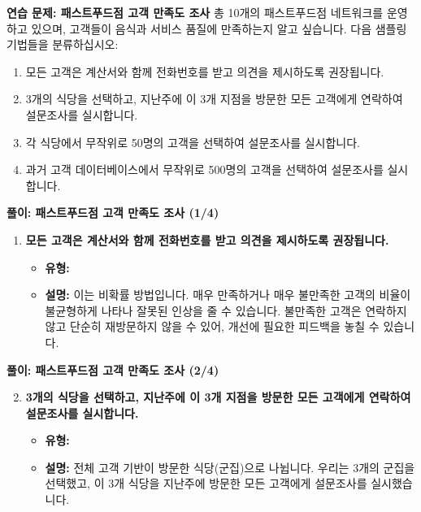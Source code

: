 \documentclass[11pt,a4paper]{article}
\begin{document}
\begin{practicebox}
\textbf{연습 문제: 패스트푸드점 고객 만족도 조사}
총 10개의 패스트푸드점 네트워크를 운영하고 있으며, 고객들이 음식과 서비스 품질에 만족하는지 알고 싶습니다. 다음 샘플링 기법들을 분류하십시오:
\begin{enumerate}
    \item 모든 고객은 계산서와 함께 전화번호를 받고 의견을 제시하도록 권장됩니다.
    \item 3개의 식당을 선택하고, 지난주에 이 3개 지점을 방문한 모든 고객에게 연락하여 설문조사를 실시합니다.
    \item 각 식당에서 무작위로 50명의 고객을 선택하여 설문조사를 실시합니다.
    \item 과거 고객 데이터베이스에서 무작위로 500명의 고객을 선택하여 설문조사를 실시합니다.
\end{enumerate}
\end{practicebox}

\begin{solutionbox}
\textbf{풀이: 패스트푸드점 고객 만족도 조사 (1/4)}
\begin{enumerate}
    \item \textbf{모든 고객은 계산서와 함께 전화번호를 받고 의견을 제시하도록 권장됩니다.}
    \begin{itemize}
        \item \textbf{유형:} 
        \item \textbf{설명:} 이는 비확률 방법입니다. 매우 만족하거나 매우 불만족한 고객의 비율이 불균형하게 나타나 잘못된 인상을 줄 수 있습니다. 불만족한 고객은 연락하지 않고 단순히 재방문하지 않을 수 있어, 개선에 필요한 피드백을 놓칠 수 있습니다.
    \end{itemize}
\end{enumerate}
\end{solutionbox}

\begin{solutionbox}
\textbf{풀이: 패스트푸드점 고객 만족도 조사 (2/4)}
\begin{enumerate}
    \setcounter{enumi}{1}
    \item \textbf{3개의 식당을 선택하고, 지난주에 이 3개 지점을 방문한 모든 고객에게 연락하여 설문조사를 실시합니다.}
    \begin{itemize}
        \item \textbf{유형:} 
        \item \textbf{설명:} 전체 고객 기반이 방문한 식당(군집)으로 나뉩니다. 우리는 3개의 군집을 선택했고, 이 3개 식당을 지난주에 방문한 모든 고객에게 설문조사를 실시했습니다.
    \end{itemize}
\end{enumerate}
\end{solutionbox}
\end{document}

